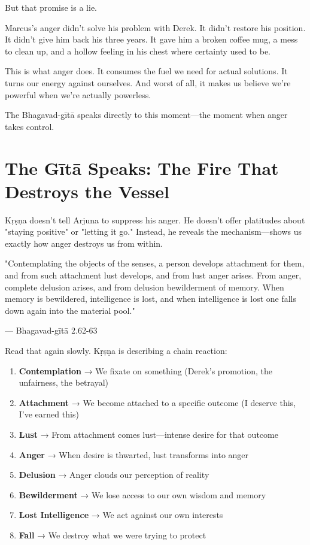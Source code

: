\documentclass[11pt,twoside]{book}
\begin{document}
But that promise is a lie.

Marcus's anger didn't solve his problem with Derek. It didn't restore his position. It didn't give him back his three years. It gave him a broken coffee mug, a mess to clean up, and a hollow feeling in his chest where certainty used to be.

This is what anger does. It consumes the fuel we need for actual solutions. It turns our energy against ourselves. And worst of all, it makes us believe we're powerful when we're actually powerless.

The Bhagavad-gītā speaks directly to this moment—the moment when anger takes control.

\section*{The Gītā Speaks: The Fire That Destroys the Vessel}

Kṛṣṇa doesn't tell Arjuna to suppress his anger. He doesn't offer platitudes about "staying positive" or "letting it go." Instead, he reveals the mechanism—shows us exactly how anger destroys us from within.

\begin{pullquote}
"Contemplating the objects of the senses, a person develops attachment for them, and from such attachment lust develops, and from lust anger arises. From anger, complete delusion arises, and from delusion bewilderment of memory. When memory is bewildered, intelligence is lost, and when intelligence is lost one falls down again into the material pool."

--- Bhagavad-gītā 2.62-63
\end{pullquote}

Read that again slowly. Kṛṣṇa is describing a chain reaction:

\begin{enumerate}
\item \textbf{\textbf{Contemplation}} → We fixate on something (Derek's promotion, the unfairness, the betrayal)
\item \textbf{\textbf{Attachment}} → We become attached to a specific outcome (I deserve this, I've earned this)
\item \textbf{\textbf{Lust}} → From attachment comes lust—intense desire for that outcome
\item \textbf{\textbf{Anger}} → When desire is thwarted, lust transforms into anger
\item \textbf{\textbf{Delusion}} → Anger clouds our perception of reality
\item \textbf{\textbf{Bewilderment}} → We lose access to our own wisdom and memory
\item \textbf{\textbf{Lost Intelligence}} → We act against our own interests
\item \textbf{\textbf{Fall}} → We destroy what we were trying to protect
\end{enumerate}
\end{document}

